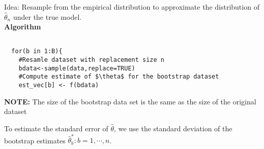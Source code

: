 \documentclass[12pt]{article}
\begin{document}
Idea: Resample from the empirical distribution to approximate the distribution of $\hat{\theta}_n$ under the true model.\\

\textbf{Algorithm}
\begin{verbatim}

  for(b in 1:B){
    #Resamle dataset with replacement size n
    bdata<-sample(data,replace=TRUE)
    #Compute estimate of $\theta$ for the bootstrap dataset
    est_vec[b] <- f(bdata)

\end{verbatim}


\textbf{NOTE:} The size of the bootstrap data set is the same as the size of the original dataset

To estimate the standard error of $\hat{\theta}$, we use the standard deviation of the bootstrap estimates $\hat{\theta}^*_b: b=1,\cdots, n$.
\end{document}
